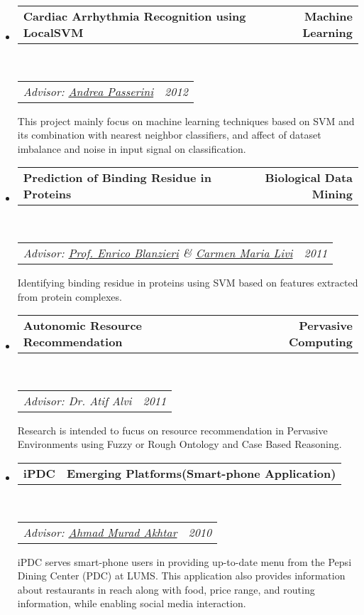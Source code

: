 \documentclass[10pt,letterpaper]{article}
\makeatletter
\newcommand{\headerrow}[2]
{\begin{tabular*}{\linewidth}{l@{\extracolsep{\fill}}r}
	#1 &
	#2 \\
\end{tabular*}}
\makeatother
\begin{document}
\begin{itemize}
	\parskip=0.1em

	\item
	\headerrow
		{\textbf{Cardiac Arrhythmia Recognition using LocalSVM}}
		{\textbf{Machine Learning}}
	\\
	\headerrow
		{\emph{Advisor: \href{http://disi.unitn.it/~passerini/}{Andrea Passerini}}}
		{\emph{2012}}
	\begin{itemize*}
		This project mainly focus on machine learning techniques based on SVM and its combination with nearest neighbor classifiers, and affect of dataset imbalance and noise in input signal on classification.
	\end{itemize*}

	\item
	\headerrow
		{\textbf{Prediction of Binding Residue in Proteins}}
		{\textbf{Biological Data Mining}}
	\\
	\headerrow
		{\emph{Advisor: \href{http://disi.unitn.it/~blanzier/}{Prof. Enrico Blanzieri} \&
            \href{http://disi.unitn.it/users/carmenmaria.livi}{Carmen Maria Livi}}}
		{\emph{2011}}
	\begin{itemize*}
		Identifying binding residue in proteins using SVM based on features extracted from protein complexes.
	\end{itemize*}

	\item
	\headerrow
		{\textbf{Autonomic Resource Recommendation}}
		{\textbf{Pervasive Computing}}
	\\
	\headerrow
		{\emph{Advisor: Dr. Atif Alvi}}
		{\emph{2011}}
	\begin{itemize*}
		Research is intended to fucus on resource recommendation in Pervasive Environments using Fuzzy or Rough Ontology and Case Based Reasoning.
	\end{itemize*}

	\item
	\headerrow
		{\textbf{iPDC}}
		{\textbf{Emerging Platforms(Smart-phone Application)}}
	\\     %
	\headerrow
		{\emph{Advisor: \href{mailto:murad@tintash.com}{Ahmad Murad Akhtar}}}
		{\emph{2010}}
	\begin{itemize*}
		iPDC serves smart-phone users in providing up-to-date menu from the Pepsi Dining Center (PDC) at LUMS. This application also provides information about restaurants in reach along with food, price range, and routing information, while enabling social media interaction.
	\end{itemize*}


\end{itemize}
\end{document}
